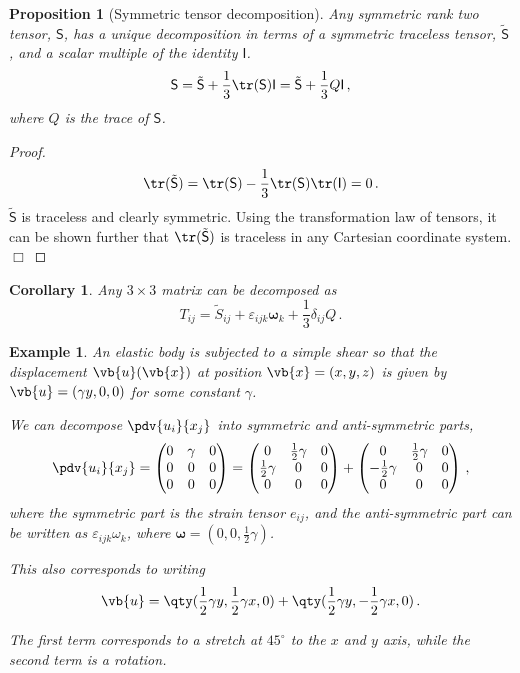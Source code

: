 \documentclass{article}
\theoremstyle{plain}\theoremheaderfont{\normalfont\itshape}\theorembodyfont{\rmfamily}\theoremseparator{.}\newtheorem*{rem}{Remark}\newtheorem*{ex}{Example}\newtheorem*{proof}{Proof}\newtheorem*{altp}{Alternative proof}
\theoremstyle{plain}\theoremheaderfont{\normalfont\bfseries}\theorembodyfont{\rmfamily}\theoremseparator{.}\newtheorem{thm}{Theorem}[section]\newtheorem{lem}[thm]{Lemma}\newtheorem{prop}[thm]{Proposition}\newtheorem*{cor}{Corollary}\newtheorem{defn}[thm]{Definition}\newtheorem{clm}[thm]{Claim}\newtheorem{clminproof}{Claim}
\theoremstyle{break}\theoremheaderfont{\normalfont\itshape}\theorembodyfont{\rmfamily}\theoremseparator{.\medskip}\newtheorem*{proofskip}{Proof}\newtheorem*{exs}{Examples}\newtheorem*{rems}{Remarks}
\theoremstyle{break}\theoremheaderfont{\normalfont\bfseries}\theorembodyfont{\rmfamily}\theoremseparator{.\medskip}\newtheorem{lemskip}[thm]{Lemma}\newtheorem{defnskip}[thm]{Definition}\newtheorem{propskip}[thm]{Proposition}\newtheorem{thmskip}[thm]{Theorem}
\numberwithin{equation}{section}
\newcommand{\qed}{\hfill\ensuremath{\Box}}
\begin{document}
	\begin{prop}[Symmetric tensor decomposition]
		Any symmetric rank two tensor, \(\mathsf{S}\), has a unique decomposition in terms of a symmetric traceless tensor, \(\tilde{\mathsf{S}}\), and a scalar multiple of the identity \(\mathsf{I}\).
		\[\mathsf{S}=\tilde{\mathsf{S}}+\frac{1}{3}\tr(\mathsf{S})\mathsf{I}=\tilde{\mathsf{S}}+\frac{1}{3}Q\mathsf{I}\,,\]
		where \(Q\) is the trace of \(\mathsf{S}\).
	\end{prop}
	\begin{proof}
		\[\tr\,\!(\tilde{\mathsf{S}})=\tr(\mathsf{S})-\frac{1}{3}\tr(\mathsf{S})\tr(\mathsf{I})=0\,.\]
		\(\tilde{\mathsf{S}}\) is traceless and clearly symmetric. Using the transformation law of tensors, it can be shown further that \(\tr\,\!(\tilde{\mathsf{S}})\) is traceless in any Cartesian coordinate system.\qed
	\end{proof}
	\begin{cor}
		Any \(3\times 3\) matrix can be decomposed as
		\[T_{ij}=\tilde{S}_{ij}+\varepsilon_{ijk}\bm{\omega}_k+\frac{1}{3}\delta_{ij}Q\,.\]
	\end{cor}
	\begin{ex}
		An elastic body is subjected to a simple shear so that the displacement \(\vb{u}(\vb{x})\) at position \(\vb{x}=(x,y,z)\) is given by \(\vb{u}=(\gamma y,0,0)\) for some constant \(\gamma\).

		We can decompose \(\pdv{u_i}{x_j}\) into symmetric and anti-symmetric parts,
		\[\pdv{u_i}{x_j}=\begin{pmatrix}
			0 & \gamma & 0\\
			0 & 0 & 0\\
			0 & 0 & 0
		\end{pmatrix}=\begin{pmatrix}
			0 & \frac{1}{2}\gamma & 0\\
			\frac{1}{2}\gamma & 0 & 0\\
			0 & 0 & 0
		\end{pmatrix}+\begin{pmatrix}
			0 & \frac{1}{2}\gamma & 0\\
			-\frac{1}{2}\gamma & 0 & 0\\
			0 & 0 & 0
		\end{pmatrix}\,,\]
		where the symmetric part is the strain tensor \(e_{ij}\), and the anti-symmetric part can be written as \(\varepsilon_{ijk}\omega_k\), where \(\bm{\omega}=(0,0,\frac{1}{2}\gamma)\).

		This also corresponds to writing
		\[\vb{u}=\qty(\frac{1}{2}\gamma y,\frac{1}{2}\gamma x,0)+\qty(\frac{1}{2}\gamma y,-\frac{1}{2}\gamma x,0)\,.\]

		The first term corresponds to a stretch at \(45^\circ\) to the \(x\) and \(y\) axis, while the second term is a rotation.
	\end{ex}
\end{document}
